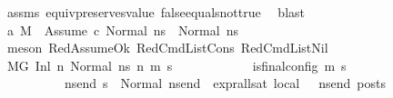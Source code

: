 \begin{isabellebody}
\ assms{\isacharparenleft}{\kern0pt}{}{\isacharminus}{\kern0pt}{}{\isacharparenright}{\kern0pt}\ equiv{\isacharunderscore}{\kern0pt}preserves{\isacharunderscore}{\kern0pt}value\ false{\isacharunderscore}{\kern0pt}equals{\isacharunderscore}{\kern0pt}not{\isacharunderscore}{\kern0pt}true\ \isamarkupfalse%
\ blast\isanewline
\ \ \isamarkupfalse%
\ \isamarkupfalse%
\ a{}{\isacharcolon}{\kern0pt}\ {\isachardoublequoteopen}{\isacharparenleft}{\kern0pt}M{\isacharcomma}{\kern0pt}{\isasymLambda}{\isacharcomma}{\kern0pt}{\isasymGamma}{\isacharcomma}{\kern0pt}{\isasymOmega}\ {\isasymturnstile}\ {\isasymlangle}{\isacharbrackleft}{\kern0pt}Assume\ c{\isacharbrackright}{\kern0pt}{\isacharcomma}{\kern0pt}\ Normal\ ns{}{\isasymrangle}\ {\isacharbrackleft}{\kern0pt}{\isasymrightarrow}{\isacharbrackright}{\kern0pt}\ {\isacharparenleft}{\kern0pt}Normal\ ns{}{\isacharparenright}{\kern0pt}{\isacharparenright}{\kern0pt}{\isachardoublequoteclose}\ \isamarkupfalse%
\ {\isacharparenleft}{\kern0pt}meson\ RedAssumeOk\ RedCmdListCons\ RedCmdListNil{\isacharparenright}{\kern0pt}\isanewline
\ \ \isamarkupfalse%
\ {\isachardoublequoteopen}{\isacharparenleft}{\kern0pt}M{\isacharcomma}{\kern0pt}{\isasymLambda}{\isacharcomma}{\kern0pt}{\isasymGamma}{\isacharcomma}{\kern0pt}{\isasymOmega}{\isacharcomma}{\kern0pt}G\ {\isasymturnstile}{\isacharparenleft}{\kern0pt}Inl\ n{}{\isacharcomma}{\kern0pt}\ Normal\ ns{}{\isacharparenright}{\kern0pt}\ {\isacharminus}{\kern0pt}n{\isasymrightarrow}{\isacharasterisk}{\kern0pt}\ {\isacharparenleft}{\kern0pt}m{}{\isacharcomma}{\kern0pt}\ s{}{\isacharparenright}{\kern0pt}{\isacharparenright}{\kern0pt}\ {\isasymLongrightarrow}\ \isanewline
\ \ \ \ \ \ \ \ \ \ {\isacharparenleft}{\kern0pt}is{\isacharunderscore}{\kern0pt}final{\isacharunderscore}{\kern0pt}config\ {\isacharparenleft}{\kern0pt}m{}{\isacharcomma}{\kern0pt}\ s{}{\isacharparenright}{\kern0pt}\ {\isasymLongrightarrow}\ \isanewline
\ \ \ \ \ \ \ \ \ \ {\isacharparenleft}{\kern0pt}{\isasymforall}ns{\isacharunderscore}{\kern0pt}end{\isachardot}{\kern0pt}\ s{}\ {\isacharequal}{\kern0pt}\ Normal\ ns{\isacharunderscore}{\kern0pt}end\ {\isasymlongrightarrow}\ {\isacharparenleft}{\kern0pt}expr{\isacharunderscore}{\kern0pt}all{\isacharunderscore}{\kern0pt}sat\ {\isasymLambda}{}{\isacharunderscore}{\kern0pt}local\ {\isasymGamma}\ {\isasymOmega}\ ns{\isacharunderscore}{\kern0pt}end{\isacharparenright}{\kern0pt}\ posts{\isacharparenright}{\kern0pt}{\isacharparenright}{\kern0pt}{\isachardoublequoteclose}\ \isanewline

\end{isabellebody}
